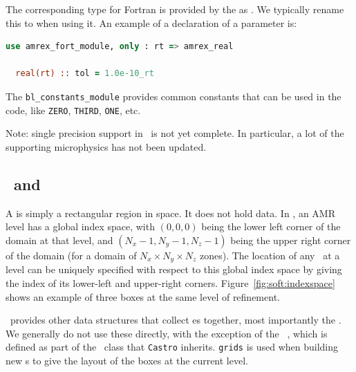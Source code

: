 The corresponding type for Fortran is provided by the
 as .  We typically rename
this to  when using it.  An example of a declaration of a
parameter is:
\begin{lstlisting}[language=fortran]
  use amrex_fort_module, only : rt => amrex_real                                       

  real(rt) :: tol = 1.0e-10_rt
\end{lstlisting}

The {\tt bl\_constants\_module} provides common constants that can
be used in the code, like {\tt ZERO}, {\tt THIRD}, {\tt ONE}, etc.

Note: single precision support in \castro\ is not yet complete.  In
particular, a lot of the supporting microphysics has not been updated.

\subsection{\bbox\ and \farraybox}

A \code{\bbox} is simply a rectangular region in space.  It does not hold
data.  In \boxlib, an AMR level has a global index space, with
$(0,0,0)$ being the lower left corner of the domain at that level, and
$(N_x-1, N_y-1, N_z-1)$ being the upper right corner of the domain
(for a domain of $N_x \times N_y \times N_z$ zones).  The location of
any \bbox\ at a level can be uniquely specified with respect to this
global index space by giving the index of its lower-left and
upper-right corners.  Figure~\ref{fig:soft:indexspace} shows an
example of three boxes at the same level of refinement.

\boxlib\ provides other data structures that collect \bbox es together,
most importantly the \code{\boxarray}.  We generally do not use these
directly, with the exception of the \boxarray\ ,
which is defined as part of the \amrlevel\ class that {\tt Castro}
inherits. {\tt grids} is used when building new \multifab s to give
the layout of the boxes at the current level.


